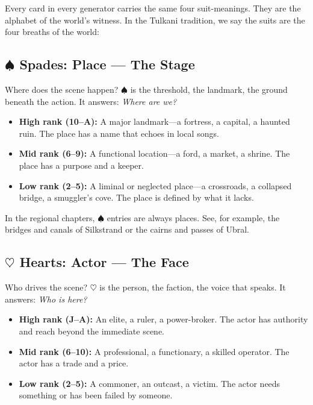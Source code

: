 \documentclass[11pt,letterpaper,twoside]{book}
\begin{document}
Every card in every generator carries the same four suit-meanings. They are the alphabet of the world's witness. In the Tulkani tradition, we say the suits are the four breaths of the world:

\subsection*{$\spadesuit$ Spades: Place --- The Stage}

Where does the scene happen? $\spadesuit$ is the threshold, the landmark, the ground beneath the action. It answers: \textit{Where are we?}

\begin{itemize}
    \item \textbf{High rank (10--A):} A major landmark---a fortress, a capital, a haunted ruin. The place has a name that echoes in local songs.
    \item \textbf{Mid rank (6--9):} A functional location---a ford, a market, a shrine. The place has a purpose and a keeper.
    \item \textbf{Low rank (2--5):} A liminal or neglected place---a crossroads, a collapsed bridge, a smuggler's cove. The place is defined by what it lacks.
\end{itemize}

In the regional chapters, $\spadesuit$ entries are always places. See, for example, the bridges and canals of Silkstrand or the cairns and passes of Ubral.

\subsection*{$\heartsuit$ Hearts: Actor --- The Face}

Who drives the scene? $\heartsuit$ is the person, the faction, the voice that speaks. It answers: \textit{Who is here?}

\begin{itemize}
    \item \textbf{High rank (J--A):} An elite, a ruler, a power-broker. The actor has authority and reach beyond the immediate scene.
    \item \textbf{Mid rank (6--10):} A professional, a functionary, a skilled operator. The actor has a trade and a price.
    \item \textbf{Low rank (2--5):} A commoner, an outcast, a victim. The actor needs something or has been failed by someone.
\end{itemize}
\end{document}
